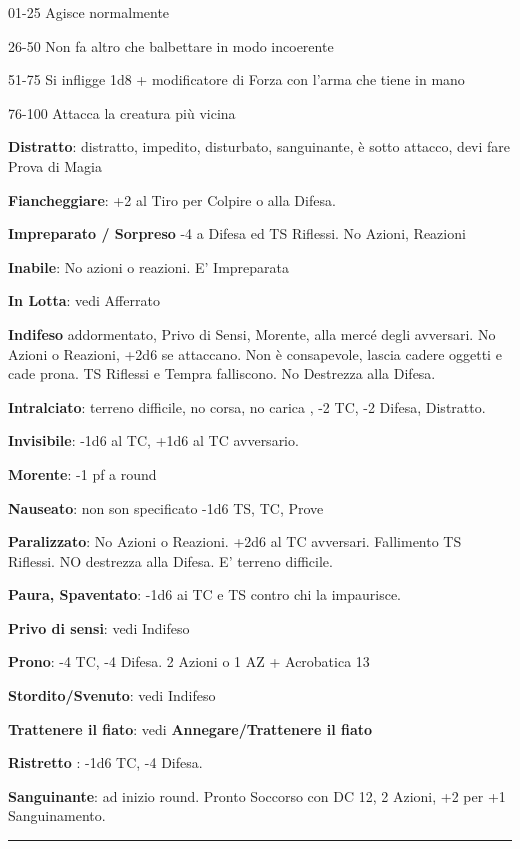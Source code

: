 \documentclass[a4paper,12 pt,openany]{book}
\newcommand{\riga}{\rule{\textwidth}{0.4pt}}
\begin{document}
\begin{textblock*}{19 cm}
\begin{multicols}{2}
01-25 Agisce normalmente

26-50 Non fa altro che balbettare in modo incoerente

51-75 Si infligge 1d8 + modificatore di Forza con l'arma che tiene in mano

76-100 Attacca la creatura più vicina

\textbf{Distratto}: distratto, impedito, disturbato, sanguinante, è sotto attacco, devi fare Prova di Magia

\textbf{Fiancheggiare}: +2 al Tiro per Colpire o alla Difesa.

\textbf{Impreparato / Sorpreso} -4 a Difesa ed TS Riflessi. No Azioni, Reazioni

\textbf{Inabile}: No azioni o reazioni. E' Impreparata

\textbf{In Lotta}: vedi Afferrato

\textbf{Indifeso} addormentato, Privo di Sensi, Morente, alla mercé degli avversari. No Azioni o Reazioni, +2d6 se attaccano. Non è consapevole, lascia cadere oggetti e cade prona. TS Riflessi e Tempra falliscono. No Destrezza alla Difesa.

\textbf{Intralciato}: terreno difficile, no corsa, no carica , -2 TC, -2 Difesa, Distratto.

\textbf{Invisibile}: -1d6 al TC, +1d6 al TC avversario.

\textbf{Morente}: -1 pf a round

\textbf{Nauseato}: non son specificato -1d6 TS, TC, Prove

\textbf{Paralizzato}: No Azioni o Reazioni. +2d6 al TC avversari. Fallimento TS Riflessi. NO destrezza alla Difesa. E' terreno difficile.

\textbf{Paura, Spaventato}: -1d6 ai TC e TS contro chi la impaurisce.

\textbf{Privo di sensi}: vedi Indifeso

\textbf{Prono}: -4 TC, -4 Difesa. 2 Azioni o 1 AZ + Acrobatica 13

\textbf{Stordito/Svenuto}: vedi Indifeso

\textbf{Trattenere il fiato}: vedi \textbf{Annegare/Trattenere il fiato}

\textbf{Ristretto} : -1d6 TC, -4 Difesa.

\textbf{Sanguinante}: ad inizio round. Pronto Soccorso con DC 12, 2 Azioni, +2 per +1 Sanguinamento.

\end{multicols}

\riga


\end{textblock*}
\end{document}
